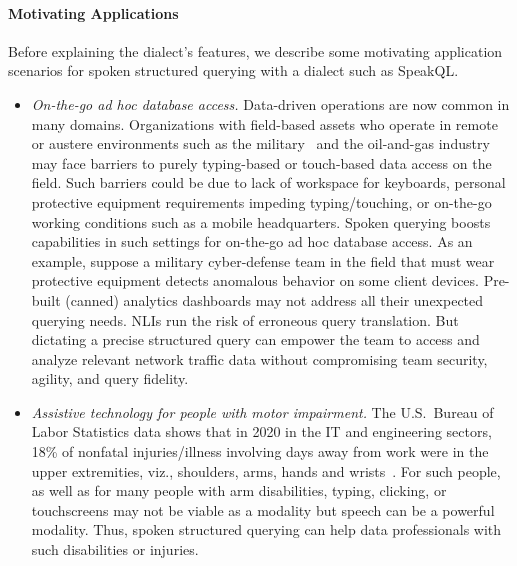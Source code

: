 
\paragraph{\textbf{Motivating Applications}}
Before explaining the dialect's features, we describe some motivating application scenarios for spoken structured querying with a dialect such as SpeakQL.

\begin{itemize}

\item \textit{On-the-go ad hoc database access.}
Data-driven operations are now common in many domains. 
Organizations with field-based assets who operate in remote or austere environments such as the military~\cite{armydatascientists} and the oil-and-gas industry~\cite{MOHAMMADPOOR2020321} may face barriers to purely typing-based or touch-based data access on the field. 
Such barriers could be due to lack of workspace for keyboards, personal protective equipment requirements impeding typing/touching, or on-the-go working conditions such as a mobile headquarters. 
Spoken querying boosts capabilities in such settings for on-the-go ad hoc database access. 
As an example, suppose a military cyber-defense team in the field that must wear protective equipment detects anomalous behavior on some client devices. 
Pre-built (canned) analytics dashboards may not address all their unexpected querying needs. 
NLIs run the risk of erroneous query translation. 
But dictating a precise structured query can empower the team to access and analyze relevant network traffic data without compromising team security, agility, and query fidelity.

\vspace{2mm}
\item \textit{Assistive technology for people with motor impairment.} 
The U.S.~Bureau of Labor Statistics data shows that in 2020 in the IT and engineering sectors, 18\% of nonfatal injuries/illness involving days away from work were in the upper extremities, viz., shoulders, arms, hands and wrists~\cite{blsinjurydata2020}. For such people, as well as for many people with arm disabilities, typing, clicking, or touchscreens may not be viable as a modality but speech can be a powerful modality.
Thus, spoken structured querying can help data professionals with such disabilities or injuries.


\end{itemize}
